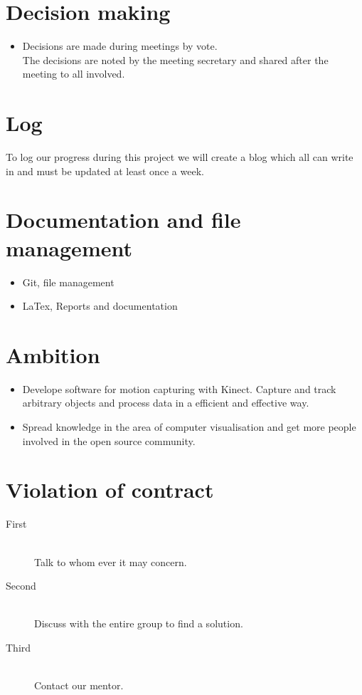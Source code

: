 \documentclass[11pt]{article}
\begin{document}
\section*{Decision making}
\begin{itemize}
	\item Decisions are made during meetings by vote. \\
	The decisions are noted by the meeting secretary and shared after the meeting to all involved.
\end{itemize}

\section*{Log}
	To log our progress during this project we will create a blog which all can write in and must be updated at least once a week.


\section*{Documentation and file management}
\begin{itemize}
	\item Git, file management
	\item  LaTex, Reports and documentation
\end{itemize}

\section*{Ambition}
\begin{itemize}
	\item Develope software for motion capturing with Kinect. Capture and track arbitrary objects and process data in a efficient and effective way.
	\item Spread knowledge in the area of computer visualisation and get more people involved in the open source community.

\end{itemize}

\section*{Violation of contract}
	\begin{description}
	\item[First] \hfill \\
	Talk to whom ever it may concern.
	\item[Second] \hfill \\
	Discuss with the entire group to find a solution.
	\item[Third] \hfill \\
	Contact our mentor.
\end{description}
\end{document}
